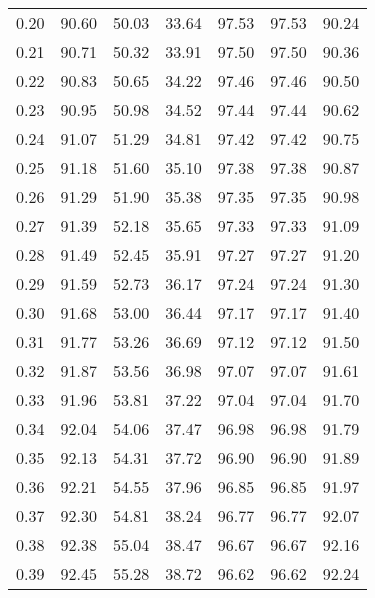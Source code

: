 \begin{tabular}{|c|c|c|c|c|c|c|}
      0.20 &     90.60 &     50.03 &      33.64 &   97.53 &      97.53 &         90.24 \\
      0.21 &     90.71 &     50.32 &      33.91 &   97.50 &      97.50 &         90.36 \\
      0.22 &     90.83 &     50.65 &      34.22 &   97.46 &      97.46 &         90.50 \\
      0.23 &     90.95 &     50.98 &      34.52 &   97.44 &      97.44 &         90.62 \\
      0.24 &     91.07 &     51.29 &      34.81 &   97.42 &      97.42 &         90.75 \\
      0.25 &     91.18 &     51.60 &      35.10 &   97.38 &      97.38 &         90.87 \\
      0.26 &     91.29 &     51.90 &      35.38 &   97.35 &      97.35 &         90.98 \\
      0.27 &     91.39 &     52.18 &      35.65 &   97.33 &      97.33 &         91.09 \\
      0.28 &     91.49 &     52.45 &      35.91 &   97.27 &      97.27 &         91.20 \\
      0.29 &     91.59 &     52.73 &      36.17 &   97.24 &      97.24 &         91.30 \\
      0.30 &     91.68 &     53.00 &      36.44 &   97.17 &      97.17 &         91.40 \\
      0.31 &     91.77 &     53.26 &      36.69 &   97.12 &      97.12 &         91.50 \\
      0.32 &     91.87 &     53.56 &      36.98 &   97.07 &      97.07 &         91.61 \\
      0.33 &     91.96 &     53.81 &      37.22 &   97.04 &      97.04 &         91.70 \\
      0.34 &     92.04 &     54.06 &      37.47 &   96.98 &      96.98 &         91.79 \\
      0.35 &     92.13 &     54.31 &      37.72 &   96.90 &      96.90 &         91.89 \\
      0.36 &     92.21 &     54.55 &      37.96 &   96.85 &      96.85 &         91.97 \\
      0.37 &     92.30 &     54.81 &      38.24 &   96.77 &      96.77 &         92.07 \\
      0.38 &     92.38 &     55.04 &      38.47 &   96.67 &      96.67 &         92.16 \\
      0.39 &     92.45 &     55.28 &      38.72 &   96.62 &      96.62 &         92.24 \\

\end{tabular}
